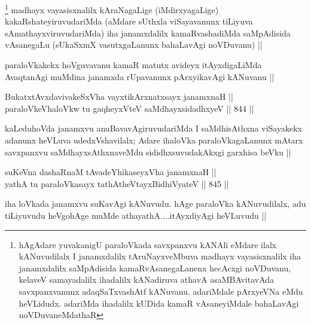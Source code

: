 \begin{artha}
\footnote{hAgAdare yuvakanigU paraloVkada savxpanxvu kANAli eMdare ilalx kANuvudilalx I janamxdalilx tAruNayxveMbuva madhayx vayasisxnalilx iha janamxdalilx saMpAdisida kamaRvAsanegaLanenx hecAcxgi noVDuvanu, kelaveV samayadalilx ihadalilx kANadiruva athavA asaMBAvitavAda savxpanxvanunx adaqSaTxvashAtf kANuvanu. adariMdale pArxyeVNa eMdu heVLidudx. adariMda ihadalilx kUDida kamaR vAsaneyiMdale bahaLavAgi noVDuvaneMdathaR}
madhayx vayasisxnalilx kAraNagaLige (iMdirxyagaLige) kakaRshateyiruvudariMda (aMdare sUthxla viSayavanunx tiLiyuva sAmathayxviruvudariMda) iha janamxdalilx kamaRvashadiMda saMpAdisida vAsanegaLu (sUkaSxmX vasutxgaLanunx bahaLavAgi noVDuvanu) ||
\end{artha}

\begin{artha}
paraloVkakekx hoVguvavanu kamaR matutx avideyx itAyxdigaLiMda AvaqtanAgi muMdina janamxda rUpavanunx pArxyikavAgi kANuvanu ||
\end{artha}


\begin{shl}
BukatxtAvxdavivakeSxVha vayxtikArxnatxsayx janamxnaH || \\
paraloVkeVhaloVkw tu gaqheyxVteV saMdhayxsidadhxyeV ||  844 ||  
\end{shl}

\begin{artha}
kaLeduhoVda janamxvu anuBavavAgiruvudariMda I saMdhisAthxna viSayakekx adanunx heVLuva udedxVshavilalx; Adare ihaloVka paraloVkagaLanunx mAtarx savxpanxvu saMdhayxsAthxnaveMdu sididhxsuvudakAkxgi garxhisa beVku ||
\end{artha}


\begin{shl}
suKeVna dashaRnaM tAvadeYhikaseyxVha janamxnaH ||  \\
yathA tu paraloVkasayx tathA\s theVtayxBidhiVyateV ||  845 || 
\end{shl}

\begin{artha}
iha loVkada janamxvu suKavAgi kANuvudu. hAge paraloVka kANuvudilalx, adu tiLiyuvudu heVgohAge muMde athayathA....itAyxdiyAgi heVLuvudu ||
\end{artha}

